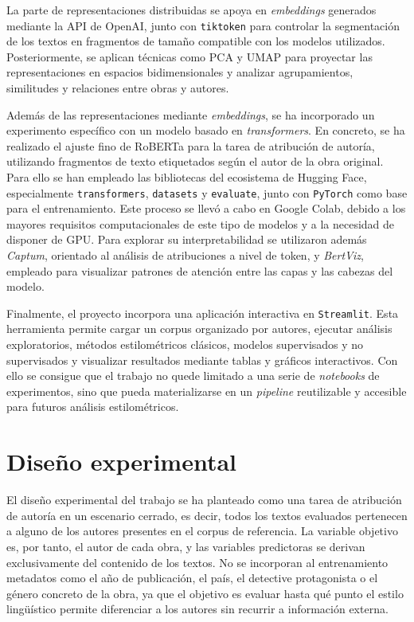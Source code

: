 \documentclass[IB]{TFUOC}%
\begin{document}
La parte de representaciones distribuidas se apoya en \textit{embeddings} generados mediante la API de OpenAI, junto con \texttt{tiktoken} para controlar la segmentación de los textos en fragmentos de tamaño compatible con los modelos utilizados. Posteriormente, se aplican técnicas como PCA y UMAP para proyectar las representaciones en espacios bidimensionales y analizar agrupamientos, similitudes y relaciones entre obras y autores.

Además de las representaciones mediante \textit{embeddings}, se ha incorporado un experimento específico con un modelo basado en \textit{transformers}. En concreto, se ha realizado el ajuste fino de RoBERTa para la tarea de atribución de autoría, utilizando fragmentos de texto etiquetados según el autor de la obra original. Para ello se han empleado las bibliotecas del ecosistema de Hugging Face, especialmente \texttt{transformers}, \texttt{datasets} y \texttt{evaluate}, junto con \texttt{PyTorch} como base para el entrenamiento. Este proceso se llevó a cabo en Google Colab, debido a los mayores requisitos computacionales de este tipo de modelos y a la necesidad de disponer de GPU. Para explorar su interpretabilidad se utilizaron además \textit{Captum}, orientado al análisis de atribuciones a nivel de token, y \textit{BertViz}, empleado para visualizar patrones de atención entre las capas y las cabezas del modelo.

Finalmente, el proyecto incorpora una aplicación interactiva en \texttt{Streamlit}. Esta herramienta permite cargar un corpus organizado por autores, ejecutar análisis exploratorios, métodos estilométricos clásicos, modelos supervisados y no supervisados y visualizar resultados mediante tablas y gráficos interactivos. Con ello se consigue que el trabajo no quede limitado a una serie de \textit{notebooks} de experimentos, sino que pueda materializarse en un \textit{pipeline} reutilizable y accesible para futuros análisis estilométricos.

\section{Diseño experimental}

El diseño experimental del trabajo se ha planteado como una tarea de atribución de autoría en un escenario cerrado, es decir, todos los textos evaluados pertenecen a alguno de los autores presentes en el corpus de referencia. La variable objetivo es, por tanto, el autor de cada obra, y las variables predictoras se derivan exclusivamente del contenido de los textos. No se incorporan al entrenamiento metadatos como el año de publicación, el país, el detective protagonista o el género concreto de la obra, ya que el objetivo es evaluar hasta qué punto el estilo lingüístico permite diferenciar a los autores sin recurrir a información externa.
\end{document}
